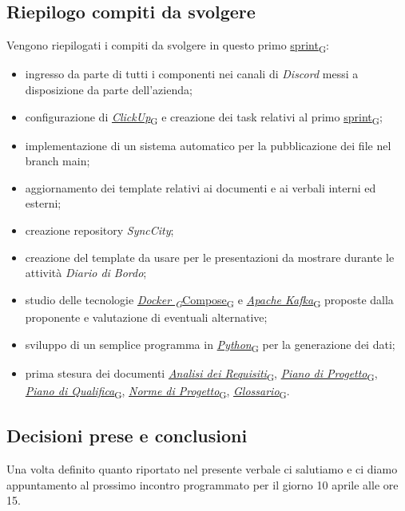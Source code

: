 \documentclass[italian,12pt]{article}
\begin{document}
\subsection{Riepilogo compiti da svolgere}
Vengono riepilogati i compiti da svolgere in questo primo \href{https://7last.github.io/docs/rtb/documentazione-interna/glossario#sprint}{sprint\textsubscript{G}}:
\begin{itemize}
	\item ingresso da parte di tutti i componenti nei canali di \textit{Discord} messi a disposizione da parte dell'azienda;
	\item configurazione di \href{https://7last.github.io/docs/rtb/documentazione-interna/glossario#clickup}{\textit{ClickUp}\textsubscript{G}} e creazione dei task relativi al primo \href{https://7last.github.io/docs/rtb/documentazione-interna/glossario#sprint}{sprint\textsubscript{G}};
	\item implementazione di un sistema automatico per la pubblicazione dei file nel branch main;
	\item aggiornamento dei template relativi ai documenti e ai verbali interni ed esterni;
	\item creazione repository \textit{SyncCity};
	\item creazione del template da usare per le presentazioni da mostrare durante le attività \textit{Diario di Bordo};
	\item studio delle tecnologie \href{https://7last.github.io/docs/rtb/documentazione-interna/glossario#docker-compose}{\href{https://7last.github.io/docs/rtb/documentazione-interna/glossario#docker}{\textit{Docker \textsubscript{G}}Compose}\textsubscript{G}} e \href{https://7last.github.io/docs/rtb/documentazione-interna/glossario#apache-kafka}{\textit{Apache Kafka}\textsubscript{G}} proposte dalla proponente e valutazione di eventuali alternative;
	\item sviluppo di un semplice programma in \href{https://7last.github.io/docs/rtb/documentazione-interna/glossario#python}{\textit{Python}\textsubscript{G}} per la generazione dei dati;
	\item prima stesura dei documenti \href{https://7last.github.io/docs/rtb/documentazione-interna/glossario#analisi-dei-requisiti}{\textit{Analisi dei Requisiti}\textsubscript{G}}, \href{https://7last.github.io/docs/rtb/documentazione-interna/glossario#piano-di-progetto}{\textit{Piano di Progetto}\textsubscript{G}}, \href{https://7last.github.io/docs/rtb/documentazione-interna/glossario#piano-di-qualifica}{\textit{Piano di Qualifica}\textsubscript{G}}, \href{https://7last.github.io/docs/rtb/documentazione-interna/glossario#norme-di-progetto}{\textit{Norme di Progetto}\textsubscript{G}}, \href{https://7last.github.io/docs/rtb/documentazione-interna/glossario#glossario}{\textit{Glossario}\textsubscript{G}}.
\end{itemize}

\subsection{Decisioni prese e conclusioni}
Una volta definito quanto riportato nel presente verbale ci salutiamo e ci diamo appuntamento al prossimo incontro programmato 
per il giorno 10 aprile alle ore 15.
\end{document}
